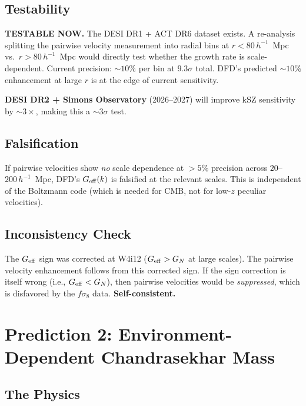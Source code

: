 \documentclass[11pt]{article}
\begin{document}
\subsection{Testability}

\textbf{TESTABLE NOW.} The DESI DR1 + ACT DR6 dataset exists. A
re-analysis splitting the pairwise velocity measurement into radial bins
at $r < 80\,h^{-1}$~Mpc vs.\ $r > 80\,h^{-1}$~Mpc would directly test
whether the growth rate is scale-dependent. Current precision: $\sim 10\%$
per bin at $9.3\sigma$ total. DFD's predicted $\sim 10\%$ enhancement at
large $r$ is at the edge of current sensitivity.

\textbf{DESI DR2 + Simons Observatory} (2026--2027) will improve kSZ
sensitivity by $\sim 3\times$, making this a $\sim 3\sigma$ test.

\subsection{Falsification}

If pairwise velocities show \emph{no} scale dependence at $>5\%$ precision
across $20$--$200\,h^{-1}$~Mpc, DFD's $G_{\rm eff}(k)$ is falsified at the
relevant scales. This is independent of the Boltzmann code (which is needed
for CMB, not for low-$z$ peculiar velocities).

\subsection{Inconsistency Check}

The $G_{\rm eff}$ sign was corrected at W4i12 ($G_{\rm eff} > G_N$ at large
scales). The pairwise velocity enhancement follows from this corrected sign.
If the sign correction is itself wrong (i.e., $G_{\rm eff} < G_N$), then
pairwise velocities would be \emph{suppressed}, which is disfavored by the
$f\sigma_8$ data. \textbf{Self-consistent.}

\section{Prediction 2: Environment-Dependent Chandrasekhar Mass}
\label{sec:chandrasekhar}

\subsection{The Physics}
\end{document}
